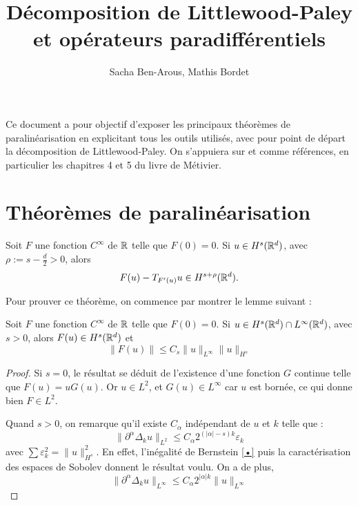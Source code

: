 \documentclass[11pt,a4paper]{article}
\title{\textbf{Décomposition de Littlewood-Paley et opérateurs paradifférentiels}}
\date{}
\author{Sacha Ben-Arous, Mathis Bordet}
\begin{document}
\maketitle

Ce document a pour objectif d'exposer les principaux théorèmes de paralinéarisation en explicitant tous les outils utilisés, avec pour point de départ la décomposition de Littlewood-Paley. On s'appuiera sur \cite{metivier} et comme \cite{dgv} références, en particulier les chapitres 4 et 5 du livre de Métivier.

\section{Théorèmes de paralinéarisation}

\begin{thm}\label{paralin}
Soit $F$ une fonction $C^{\infty}$ de $\mathbb R$ telle que $F(0)=0$. Si $u\in H^s(\mathbb R^d)$, avec $\rho := s - \frac{d}{2}>0 $, alors 
\begin{equation}
F(u) - T_{F'(u)}u \in H^{s+\rho}(\mathbb R^d).
\end{equation}
\end{thm}
Pour prouver ce théorème, on commence par montrer le lemme suivant : 

\begin{lemma}
Soit $F$ une fonction $C^{\infty}$ de $\mathbb R$ telle que $F(0)=0$. Si $u\in H^s(\mathbb R^d)\cap L^{\infty}(\mathbb R^d) $, avec $s>0 $, alors $F(u) \in H^s(\mathbb R^d)$ et 
\begin{equation}
\|F(u)\| \leq C_s \|u\|_{L^{\infty}} \|u\|_{H^s}
\end{equation}
\end{lemma}

\begin{proof}
Si $s=0$, le résultat se déduit de l'existence d'une fonction $G$ continue telle que $F(u)=uG(u)$. Or $u\in L^2$, et $G(u) \in L^{\infty}$ car $u$ est bornée, ce qui donne bien $F\in L^2$.
\par Quand $s>0$, on remarque qu'il existe $C_\alpha$  indépendant de $u$ et $k$ telle que  : 
\begin{equation}
\|\partial^\alpha \Delta_k u \|_{L^2} \leq C_\alpha 2^{(|\alpha|-s)k} \varepsilon_k
\end{equation}
avec $\sum \varepsilon_k^2 =  \|u\|_{H^s}^2$. En effet, l'inégalité de Bernstein \ref{•} puis la caractérisation des espaces de Sobolev donnent le résultat voulu. On a de plus,
\begin{equation}
\|\partial^\alpha \Delta_k u \|_{L^{\infty}} \leq C_\alpha 2^{|\alpha|k} \|u\|_{L^{\infty}}
\end{equation}
\end{proof}


\newpage
\printbibliography[heading=bibintoc, title={Références}]
\end{document}
